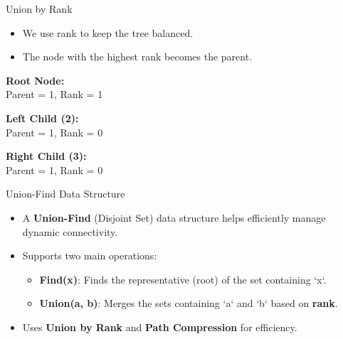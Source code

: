 \begin{frame}{Union by Rank}
    \begin{itemize}
        \item We use rank to keep the tree balanced.
        \item The node with the highest rank becomes the parent.
    \end{itemize}

    \begin{center}
        \begin{minipage}{0.5\textwidth}
            \centering
        \end{minipage}
        \hfill
        \begin{minipage}{0.4\textwidth}
            \textbf{Root Node:} \\
            Parent = 1, Rank = 1

            \vspace{0.5cm}

            \textbf{Left Child (2):} \\
            Parent = 1, Rank = 0

            \vspace{0.5cm}

            \textbf{Right Child (3):} \\
            Parent = 1, Rank = 0
        \end{minipage}
    \end{center}

\end{frame}




\begin{frame}{Union-Find Data Structure}
    \begin{itemize}
        \item A \textbf{Union-Find} (Disjoint Set) data structure helps efficiently manage dynamic connectivity.
        \item Supports two main operations:
        \begin{itemize}
            \item \textbf{Find(x)}: Finds the representative (root) of the set containing `x`.
            \item \textbf{Union(a, b)}: Merges the sets containing `a` and `b` based on \textbf{rank}.
        \end{itemize}
        \item Uses \textbf{Union by Rank} and \textbf{Path Compression} for efficiency.
    \end{itemize}
\end{frame}

